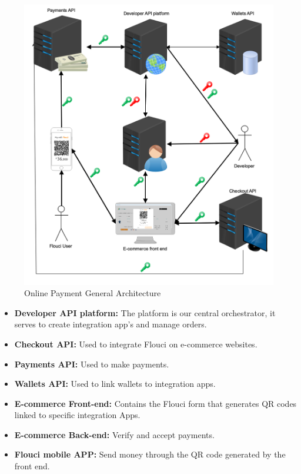 \begin{spacing}{1.2}
\begin{figure}[H]\centering
\includegraphics[scale=0.4]{generalarchitecture.png}
\caption{Online Payment General Architecture}
\label{fig:garch}
\end{figure}

\begin{itemize}
	\item \textbf{Developer API platform:} The platform is our central orchestrator, it serves to create integration app's and manage orders.
	\item \textbf{Checkout API:}  Used to integrate Flouci on e-commerce websites.
	\item \textbf{Payments API:}  Used to make payments.
	\item \textbf{Wallets API:}  Used to link wallets to integration apps.
	\item \textbf{E-commerce Front-end:} Contains the Flouci form that generates QR codes linked to specific integration Apps.
	\item \textbf{E-commerce Back-end:} Verify and accept payments.
	\item \textbf{Flouci mobile APP:} Send money through the QR code generated by the front end.
\end{itemize}


\end{spacing}
